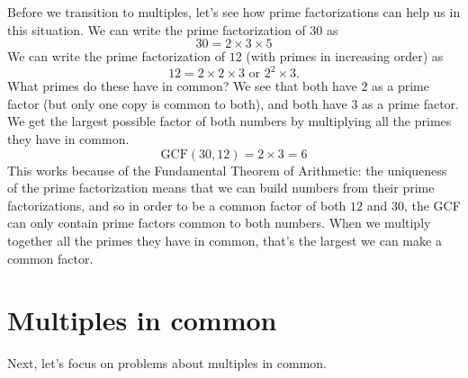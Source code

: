 \documentclass{ximera}
\begin{document}
Before we transition to multiples, let's see how prime factorizations can help us in this situation. We can write the prime factorization of $30$ as
\[
30 = 2 \times 3 \times 5
\]
We can write the prime factorization of $12$ (with primes in increasing order) as
\[
12 = 2 \times 2 \times 3 \textrm{ or } 2^2 \times 3.
\]
What primes do these have in common? We see that both have $2$ as a prime factor (but only one copy is common to both), and both have $3$ as a prime factor. We get the largest possible factor of both numbers by multiplying all the primes they have in common.
\[
\textrm{GCF}(30, 12) = 2 \times 3 = 6
\]
This works because of the Fundamental Theorem of Arithmetic: the uniqueness of the prime factorization means that we can build numbers from their prime factorizations, and so in order to be a common factor of both $12$ and $30$, the GCF can only contain prime factors common to both numbers. When we multiply together all the primes they have in common, that's the largest we can make a common factor. 



\section{Multiples in common}

Next, let's focus on problems about multiples in common.
\end{document}
